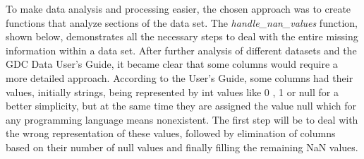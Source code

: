 To make data analysis and processing easier, the chosen approach was to create functions that analyze sections of the data set. The \textit{handle\_nan\_values} function, shown below, demonstrates all the necessary steps to deal with the entire missing information within a data set. After further analysis of different datasets and the GDC Data User's Guide, it became clear that some columns would require a more detailed approach. According to the User's Guide, some columns had their values, initially strings, being represented by int values like 0 , 1 or null for a better simplicity, but at the same time they are assigned the value null which for any programming language means nonexistent. The first step will be to deal with the wrong representation of these values, followed by elimination of columns based on their number of null values and finally filling the remaining NaN values.

